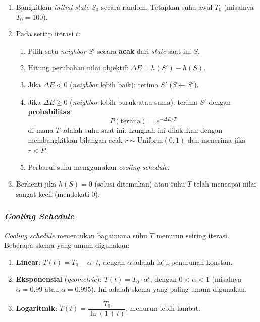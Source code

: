 \documentclass[12pt,a4paper]{article}
\begin{document}
\begin{enumerate}[label=\arabic*.]
    \item Bangkitkan \textit{initial state} $S_0$ secara random. Tetapkan suhu awal $T_0$ (misalnya $T_0 = 100$).
    \item Pada setiap iterasi $t$:
    \begin{enumerate}[label=\alph*.]
        \item Pilih satu \textit{neighbor} $S'$ secara \textbf{acak} dari \textit{state} saat ini $S$.
        \item Hitung perubahan nilai objektif: $\Delta E = h(S') - h(S)$.
        \item Jika $\Delta E < 0$ (\textit{neighbor} lebih baik): terima $S'$ ($S \leftarrow S'$).
        \item Jika $\Delta E \geq 0$ (\textit{neighbor} lebih buruk atau sama): terima $S'$ dengan \textbf{probabilitas}:
        \[
            P(\text{terima}) = e^{-\Delta E / T}
        \]
        di mana $T$ adalah suhu saat ini. Langkah ini dilakukan dengan membangkitkan bilangan acak $r \sim \text{Uniform}(0, 1)$ dan menerima jika $r < P$.
        \item Perbarui suhu menggunakan \textit{cooling schedule}.
    \end{enumerate}
    \item Berhenti jika $h(S) = 0$ (solusi ditemukan) atau suhu $T$ telah mencapai nilai sangat kecil (mendekati 0).
\end{enumerate}

\subsubsection{\textit{Cooling Schedule}}
\label{subsubsec:cooling-schedule}

\textit{Cooling schedule} menentukan bagaimana suhu $T$ menurun seiring iterasi. Beberapa skema yang umum digunakan:

\begin{enumerate}[label=\arabic*.]
    \item \textbf{Linear}: $T(t) = T_0 - \alpha \cdot t$, dengan $\alpha$ adalah laju penurunan konstan.
    \item \textbf{Eksponensial} (\textit{geometric}): $T(t) = T_0 \cdot \alpha^t$, dengan $0 < \alpha < 1$ (misalnya $\alpha = 0.99$ atau $\alpha = 0.995$). Ini adalah skema yang paling umum digunakan.
    \item \textbf{Logaritmik}: $T(t) = \dfrac{T_0}{\ln(1 + t)}$, menurun lebih lambat.
\end{enumerate}
\end{document}
